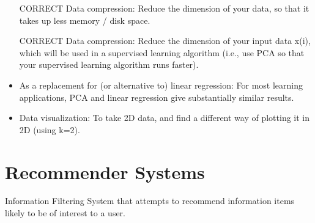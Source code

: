 \begin{itemize}
\item [CORRECT] Data compression: Reduce the dimension of your data, so that it takes up less memory / disk space.

\item [CORRECT] Data compression: Reduce the dimension of your input data x(i), which will be used in a supervised learning algorithm (i.e., use PCA so that your supervised learning algorithm runs faster).

\item As a replacement for (or alternative to) linear regression: For most learning applications, PCA and linear regression give substantially similar results.

\item Data visualization: To take 2D data, and find a different way of plotting it in 2D (using k=2).

\end{itemize}


\section{Recommender Systems}

Information Filtering System that attempts to recommend information items likely
to be of interest to a user.

